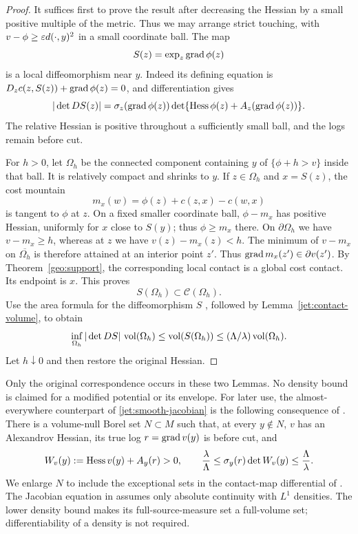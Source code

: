 \begin{proof}
It suffices first to prove the result after decreasing the Hessian by a
small positive multiple of the metric. Thus we may arrange strict
touching, with
$v-\phi\ge\varepsilon d(\cdot,y)^2$ in a small coordinate ball. The map
\[
 S(z)=\exp_z\operatorname{grad}\phi(z)
\]
is a local diffeomorphism near $y$. Indeed its defining equation is
$D_zc(z,S(z))+\operatorname{grad}\phi(z)=0$, and differentiation gives
\begin{equation}\label{jet:smooth-jacobian}
 |\det DS(z)|
 =\sigma_z(\operatorname{grad}\phi(z))
   \det\{\operatorname{Hess}\phi(z)+A_z(\operatorname{grad}\phi(z))\}.
\end{equation}
The relative Hessian is positive throughout a sufficiently small ball,
and the logs remain before cut.

For $h>0$, let $\Omega_h$ be the connected component containing $y$ of
$\{\phi+h>v\}$ inside that ball. It is relatively compact and shrinks to
$y$. If $z\in\Omega_h$ and $x=S(z)$, the cost mountain
\[
 m_x(w)=\phi(z)+c(z,x)-c(w,x)
\]
is tangent to $\phi$ at $z$. On a fixed smaller coordinate ball,
$\phi-m_x$ has positive Hessian, uniformly for $x$ close to $S(y)$;
thus $\phi\ge m_x$ there. On $\partial\Omega_h$ we have
$v-m_x\ge h$, whereas at $z$ we have $v(z)-m_x(z)<h$.
The minimum of $v-m_x$ on $\overline{\Omega_h}$ is therefore attained
at an interior point $z'$. Thus $\operatorname{grad} m_x(z')\in\partial v(z')$.
By Theorem~\ref{geo:support}, the corresponding local contact is
a global cost contact. Its endpoint is $x$. This proves
\[
 S(\Omega_h)\subset\mathcal C(\Omega_h).
\]
Use the area formula for the diffeomorphism $S$
\cite[Chapter~2, Theorem~3.3]{Simon2018}, followed by
Lemma~\ref{jet:contact-volume}, to obtain
\[
 \inf_{\Omega_h}|\det DS|\,\operatorname{vol}(\Omega_h)
 \le \operatorname{vol}(S(\Omega_h))
 \le(\Lambda/\lambda)\operatorname{vol}(\Omega_h).
\]
Let $h\downarrow0$ and then restore the original Hessian.
\end{proof}

Only the original correspondence occurs in these two Lemmas.
No density bound is claimed for a modified potential or its envelope.
For later use, the almost-everywhere counterpart of
\eqref{jet:smooth-jacobian} is the following consequence of
\cite[Proposition~4.1 and Theorem~4.2]{CEMS2001}. There is a
volume-null Borel set $N\subset M$ such that, at every $y\notin N$,
$v$ has an Alexandrov Hessian, its true log $r=\operatorname{grad} v(y)$ is before
cut, and
\begin{equation}\label{jet:ae-jacobian}
 W_v(y):=\operatorname{Hess} v(y)+A_y(r)>0,\qquad
 \frac{\lambda}{\Lambda}
 \le \sigma_y(r)\det W_v(y)
 \le\frac{\Lambda}{\lambda}.
\end{equation}
We enlarge $N$ to include the exceptional sets in the contact-map
differential of \cite[Proposition~4.1(b)]{CEMS2001}. The Jacobian
equation in \cite[Theorem~4.2]{CEMS2001} assumes only absolute
continuity with $L^1$ densities. The lower density bound makes its
full-source-measure set a full-volume set; differentiability of a
density is not required.

